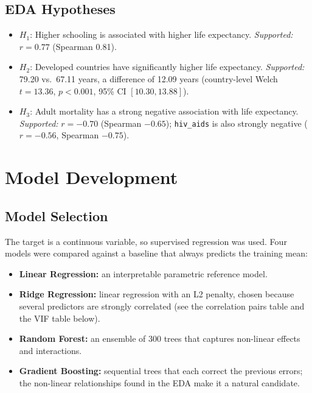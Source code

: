 \documentclass[12pt,a4paper]{article}
\begin{document}
\subsection{EDA Hypotheses}
\begin{itemize}
\item $H_1$: Higher schooling is associated with higher life expectancy.
      \emph{Supported:} $r=0.77$ (Spearman 0.81).
\item $H_2$: Developed countries have significantly higher life expectancy.
      \emph{Supported:} 79.20 vs.\ 67.11 years, a difference of 12.09 years
      (country-level Welch $t=13.36$, $p<0.001$, 95\% CI $[10.30, 13.88]$).
\item $H_3$: Adult mortality has a strong negative association with life expectancy.
      \emph{Supported:} $r=-0.70$ (Spearman $-0.65$); \texttt{hiv\_aids} is also strongly negative
      ($r=-0.56$, Spearman $-0.75$).
\end{itemize}

\section{Model Development}\label{sec:model}
\subsection{Model Selection}
The target is a continuous variable, so supervised regression was used. Four models were compared
against a baseline that always predicts the training mean:
\begin{itemize}
  \item \textbf{Linear Regression:} an interpretable parametric reference model.
  \item \textbf{Ridge Regression:} linear regression with an L2 penalty, chosen because several
        predictors are strongly correlated (see the correlation pairs table and the VIF table below).
  \item \textbf{Random Forest:} an ensemble of 300 trees that captures non-linear effects and
        interactions.
  \item \textbf{Gradient Boosting:} sequential trees that each correct the previous errors; the
        non-linear relationships found in the EDA make it a natural candidate.
\end{itemize}
\end{document}
